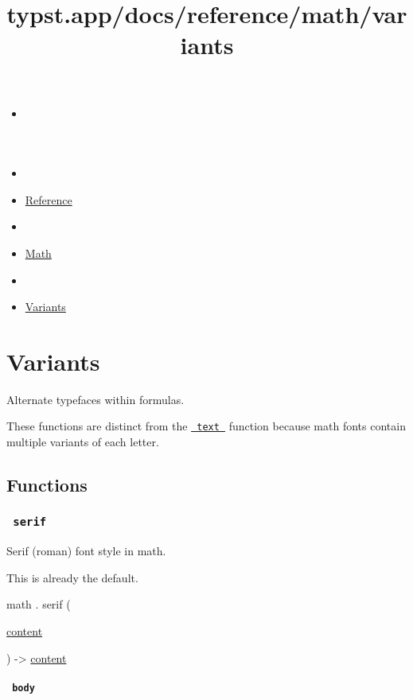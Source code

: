 \title{typst.app/docs/reference/math/variants}

\begin{itemize}
\tightlist
\item
  \href{/docs}{}
\item
  
\item
  \href{/docs/reference/}{Reference}
\item
  
\item
  \href{/docs/reference/math/}{Math}
\item
  
\item
  \href{/docs/reference/math/variants}{Variants}
\end{itemize}

\section{Variants}\label{summary}

Alternate typefaces within formulas.

These functions are distinct from the
\href{/docs/reference/text/text/}{\texttt{\ text\ }} function because
math fonts contain multiple variants of each letter.

\subsection{Functions}\label{functions}

\subsubsection{\texorpdfstring{\texttt{\ serif\ }}{ serif }}\label{functions-serif}

Serif (roman) font style in math.

This is already the default.

math { . } { serif } (

{ \href{/docs/reference/foundations/content/}{content} }

) -\textgreater{} \href{/docs/reference/foundations/content/}{content}

\paragraph{\texorpdfstring{\texttt{\ body\ }}{ body }}\label{functions-serif-body}

